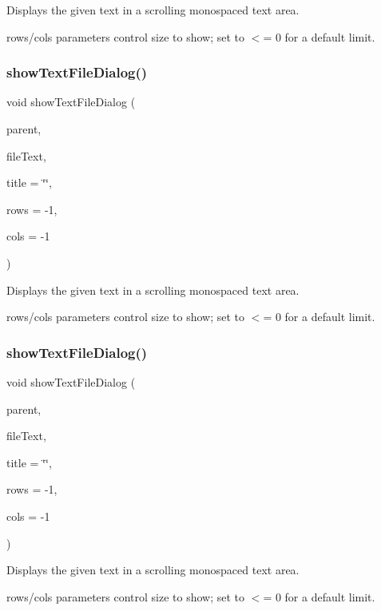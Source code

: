 Displays the given text in a scrolling monospaced text area. 

rows/cols parameters control size to show; set to $<$= 0 for a default limit. \mbox{\label{classGOptionPane_af8cf594b9d9b1c6569fc8a3ca2ee0602}} 
\subsubsection{\texorpdfstring{show\+Text\+File\+Dialog()}{showTextFileDialog()}\hspace{0.1cm}{\footnotesize\ttfamily [2/3]}}
{\footnotesize\ttfamily void show\+Text\+File\+Dialog (\begin{DoxyParamCaption}\item[{\mbox{\hyperlink{classGWindow}{G\+Window}} $\ast$}]{parent,  }\item[{const std\+::string \&}]{file\+Text,  }\item[{const std\+::string \&}]{title = {\ttfamily \char`\"{}\char`\"{}},  }\item[{int}]{rows = {\ttfamily -\/1},  }\item[{int}]{cols = {\ttfamily -\/1} }\end{DoxyParamCaption})\hspace{0.3cm}{\ttfamily [static]}}



Displays the given text in a scrolling monospaced text area. 

rows/cols parameters control size to show; set to $<$= 0 for a default limit. \mbox{\label{classGOptionPane_a6d1d2769369649efbc5142804ff8b165}} 
\subsubsection{\texorpdfstring{show\+Text\+File\+Dialog()}{showTextFileDialog()}\hspace{0.1cm}{\footnotesize\ttfamily [3/3]}}
{\footnotesize\ttfamily void show\+Text\+File\+Dialog (\begin{DoxyParamCaption}\item[{Q\+Widget $\ast$}]{parent,  }\item[{const std\+::string \&}]{file\+Text,  }\item[{const std\+::string \&}]{title = {\ttfamily \char`\"{}\char`\"{}},  }\item[{int}]{rows = {\ttfamily -\/1},  }\item[{int}]{cols = {\ttfamily -\/1} }\end{DoxyParamCaption})\hspace{0.3cm}{\ttfamily [static]}}



Displays the given text in a scrolling monospaced text area. 

rows/cols parameters control size to show; set to $<$= 0 for a default limit. 